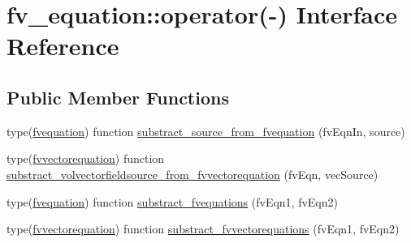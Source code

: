 \hypertarget{interfacefv__equation_1_1operator_07-_08}{\section{fv\-\_\-equation\-:\-:operator(-\/) Interface Reference}
\label{interfacefv__equation_1_1operator_07-_08}
}
\subsection*{Public Member Functions}
\begin{DoxyCompactItemize}
\item 
type(\hyperlink{structfv__equation_1_1fvequation}{fvequation}) function \hyperlink{interfacefv__equation_1_1operator_07-_08_a801deeb5e7a9a2dfe9526205e75548f6}{substract\-\_\-source\-\_\-from\-\_\-fvequation} (fv\-Eqn\-In, source)
\item 
type(\hyperlink{structfv__equation_1_1fvvectorequation}{fvvectorequation}) function \hyperlink{interfacefv__equation_1_1operator_07-_08_aa09785636371f5895840f78e65894414}{substract\-\_\-volvectorfieldsource\-\_\-from\-\_\-fvvectorequation} (fv\-Eqn, vec\-Source)
\item 
type(\hyperlink{structfv__equation_1_1fvequation}{fvequation}) function \hyperlink{interfacefv__equation_1_1operator_07-_08_ac134bfbf28feb1acc49f3659d2c1c033}{substract\-\_\-fvequations} (fv\-Eqn1, fv\-Eqn2)
\item 
type(\hyperlink{structfv__equation_1_1fvvectorequation}{fvvectorequation}) function \hyperlink{interfacefv__equation_1_1operator_07-_08_adcff2fb36451f864742ae9de51f3e9cc}{substract\-\_\-fvvectorequations} (fv\-Eqn1, fv\-Eqn2)
\end{DoxyCompactItemize}


